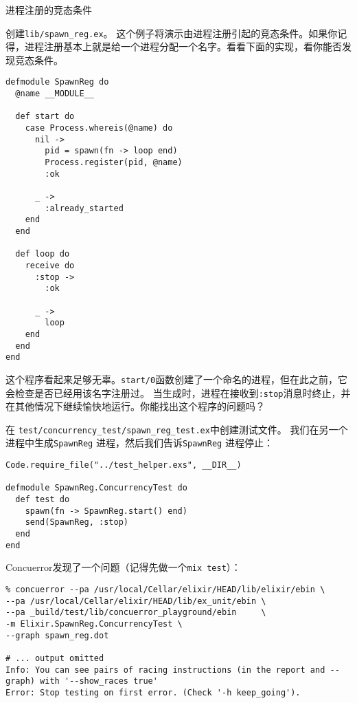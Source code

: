 \begin{example}{进程注册的竞态条件}

创建\texttt{lib/spawn\_reg.ex}。
这个例子将演示由进程注册引起的竞态条件。如果你记得，进程注册基本上就是给一个进程分配一个名字。看看下面的实现，看你能否发现竞态条件。

\begin{code}{}
\begin{verbatim}
defmodule SpawnReg do
  @name __MODULE__

  def start do
    case Process.whereis(@name) do
      nil ->
        pid = spawn(fn -> loop end)
        Process.register(pid, @name)
        :ok

      _ ->
        :already_started
    end
  end

  def loop do
    receive do
      :stop ->
        :ok

      _ ->
        loop
    end
  end
end
\end{verbatim}
\end{code}

这个程序看起来足够无辜。\texttt{start/0}函数创建了一个命名的进程，但在此之前，它会检查是否已经用该名字注册过。
当生成时，进程在接收到\texttt{:stop}消息时终止，并在其他情况下继续愉快地运行。你能找出这个程序的问题吗？

在 \texttt{test/concurrency\_test/spawn\_reg\_test.ex}中创建测试文件。
我们在另一个进程中生成\texttt{SpawnReg} 进程，然后我们告诉\texttt{SpawnReg} 进程停止：

\begin{code}{}
\begin{verbatim}
Code.require_file("../test_helper.exs", __DIR__)

defmodule SpawnReg.ConcurrencyTest do
  def test do
    spawn(fn -> SpawnReg.start() end)
    send(SpawnReg, :stop)
  end
end
\end{verbatim}
\end{code}

Concuerror发现了一个问题（记得先做一个\texttt{mix test}）：

\begin{code}{}
\begin{verbatim}
% concuerror --pa /usr/local/Cellar/elixir/HEAD/lib/elixir/ebin \
--pa /usr/local/Cellar/elixir/HEAD/lib/ex_unit/ebin \
--pa _build/test/lib/concuerror_playground/ebin     \
-m Elixir.SpawnReg.ConcurrencyTest \
--graph spawn_reg.dot

# ... output omitted
Info: You can see pairs of racing instructions (in the report and --graph) with '--show_races true'
Error: Stop testing on first error. (Check '-h keep_going').


\end{verbatim}
\end{code}
\end{example}
